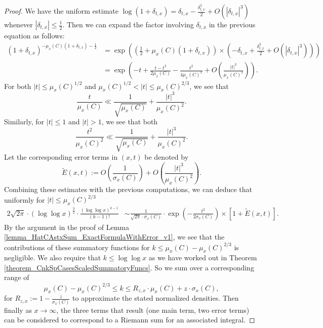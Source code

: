 \documentclass[11pt,reqno,a4letter]{article}
\numberwithin{figure}{section}
\numberwithin{table}{section}
\theoremstyle{plain}
\numberwithin{theorem}{section}
\theoremstyle{definition}
\begin{document}
\begin{proof}
We have the uniform estimate 
$\log(1+\delta_{t,x}) = \delta_{t,x} - \frac{\delta_{t,x}^2}{2} + O(|\delta_{t,x}|^3)$ whenever 
$|\delta_{t,x}| \leq \frac{1}{2}$. Then we can expand the factor involving $\delta_{t,x}$ 
in the previous equation as follows: 
\begin{align*} 
(1+\delta_{t,x})^{-\mu_x(C) (1+\delta_{t,x}) - \frac{1}{2}} & = 
     \exp\left(\left(\frac{1}{2}+\mu_x(C) (1+\delta_{t,x})\right) \times 
     \left(-\delta_{t,x} + \frac{\delta_{t,x}^2}{2} + O(|\delta_{t,x}|^3)\right)\right) \\ 
     & = \exp\left(-t + \frac{t-t^2}{2\mu_x(C)} - \frac{t^2}{4\mu_x(C)^2} + 
     O\left(\frac{|t|^3}{\mu_x(C)^2}\right)\right). 
\end{align*} 
For both $|t| \leq \mu_x(C)^{1/2}$ and 
$\mu_x(C)^{1/2} < |t| \leq \mu_x(C)^{2/3}$, 
we see that 
\[
\frac{t}{\mu_x(C)} \ll \frac{1}{\sqrt{\mu_x(C)}} + \frac{|t|^3}{\mu_x(C)^2}. 
\]
Similarly, for $|t| \leq 1$ and $|t| > 1$, we see that both 
\[
\frac{t^2}{\mu_x(C)^2} \ll \frac{1}{\sqrt{\mu_x(C)}} + 
     \frac{|t|^3}{\mu_x(C)^2}. 
\] 
Let the corresponding error terms in $(x, t)$ be denoted by 
\[
\widetilde{E}(x, t) := O\left(\frac{1}{\sigma_x(C)}\right) + 
     O\left(\frac{|t|^3}{\mu_x(C)^2}\right). 
\]
Combining these estimates with the previous computations, we can deduce that 
uniformly for $|t| \leq \mu_x(C)^{2/3}$ 
\begin{align*} 
2\sqrt{2\pi} \cdot (\log\log x)^{\frac{3}{2}} \cdot 
     \frac{(\log\log x)^{k-1}}{(k-1)!} & \sim 
     \frac{1}{\sqrt{2\pi} \cdot \sigma_x(C)} 
     \cdot \exp\left(-\frac{t^2}{2\sigma_x(C)}\right) \times 
     \left[1 + \widetilde{E}(x, t)\right]. 
\end{align*} 
By the argument in the proof of 
Lemma \ref{lemma_HatCAstxSum_ExactFormulaWithError_v1}, we see that 
the contributions of these summatory functions for 
$k \leq \mu_x(C) - \mu_x(C)^{2/3}$ is negligible. 
We also require that $k \leq \log\log x$ as we have worked out in 
Theorem \ref{theorem_CnkSpCasesScaledSummatoryFuncs}. So we sum over a 
corresponding range of 
\[
\mu_x(C) -\mu_x(C)^{2/3} \leq k \leq R_{z,x} \cdot \mu_x(C) + z \cdot \sigma_x(C), 
\] 
for $R_{z,x} := 1 - \frac{z}{\sigma_x(C)}$ to approximate the 
stated normalized densities. 
Then finally as $x \rightarrow \infty$, the 
three terms that result (one main term, two error terms) 
can be considered to correspond to a Riemann sum for an associated integral. 
\end{proof} 
\end{document}
